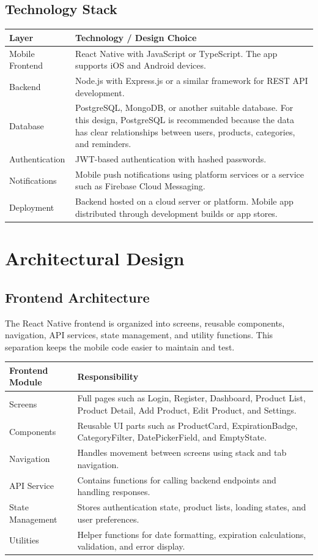 \documentclass[12pt]{article}
\begin{document}
\subsection{Technology Stack}
\begin{longtable}{|p{}|p{}|}
\hline
\textbf{Layer} & \textbf{Technology / Design Choice} \\
\hline
Mobile Frontend & React Native with JavaScript or TypeScript. The app supports iOS and Android devices. \\
\hline
Backend & Node.js with Express.js or a similar framework for REST API development. \\
\hline
Database & PostgreSQL, MongoDB, or another suitable database. For this design, PostgreSQL is recommended because the data has clear relationships between users, products, categories, and reminders. \\
\hline
Authentication & JWT-based authentication with hashed passwords. \\
\hline
Notifications & Mobile push notifications using platform services or a service such as Firebase Cloud Messaging. \\
\hline
Deployment & Backend hosted on a cloud server or platform. Mobile app distributed through development builds or app stores. \\
\hline
\end{longtable}

\section{Architectural Design}

\subsection{Frontend Architecture}
The React Native frontend is organized into screens, reusable components, navigation, API services, state management, and utility functions. This separation keeps the mobile code easier to maintain and test.

\begin{longtable}{|p{}|p{}|}
\hline
\textbf{Frontend Module} & \textbf{Responsibility} \\
\hline
Screens & Full pages such as Login, Register, Dashboard, Product List, Product Detail, Add Product, Edit Product, and Settings. \\
\hline
Components & Reusable UI parts such as ProductCard, ExpirationBadge, CategoryFilter, DatePickerField, and EmptyState. \\
\hline
Navigation & Handles movement between screens using stack and tab navigation. \\
\hline
API Service & Contains functions for calling backend endpoints and handling responses. \\
\hline
State Management & Stores authentication state, product lists, loading states, and user preferences. \\
\hline
Utilities & Helper functions for date formatting, expiration calculations, validation, and error display. \\
\hline
\end{longtable}
\end{document}
